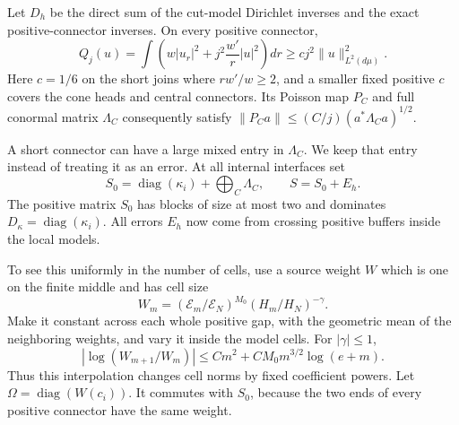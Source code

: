 Let $D_h$ be the direct sum of the cut-model Dirichlet inverses and
the exact positive-connector inverses.  On every positive connector,
\begin{equation}\label{eq:rad-eq-hn5}
 Q_j(u)=\int\left(w|u_r|^2+j^2\frac{w'}r|u|^2\right)dr
               \ge cj^2\|u\|_{L^2(d\mu)}^2.
\end{equation}
Here $c=1/6$ on the short joins where $rw'/w\ge2$, and a smaller
fixed positive $c$ covers the cone heads and central connectors.
Its Poisson map $P_C$ and full conormal matrix $\Lambda_C$ consequently
satisfy $\|P_Ca\|\le(C/j)(a^*\Lambda_Ca)^{1/2}$.

A short connector can have a large mixed entry in $\Lambda_C$.
We keep that entry instead of treating it as an error.  At all internal
interfaces set
\begin{equation}\label{eq:rad-eq-hn6}
 S_0=\operatorname{diag}(\kappa_i)+\bigoplus_C\Lambda_C,
 \qquad S=S_0+E_h.
\end{equation}
The positive matrix $S_0$ has blocks of size at most two and dominates
$D_\kappa=\operatorname{diag}(\kappa_i)$.  All errors $E_h$ now
come from crossing positive buffers inside the local models.

To see this uniformly in the number of cells, use a source weight $W$
which is one on the finite middle and has cell size
\begin{equation}\label{eq:rad-eq-hn4}
 W_m=(\mathcal E_m/\mathcal E_N)^{M_0}(H_m/H_N)^{-\gamma}.
\end{equation}
Make it constant across each whole positive gap, with the geometric
mean of the neighboring weights, and vary it inside the model cells.
For $|\gamma|\le1$,
\begin{equation}\label{eq:adjacent-weight-ratio-new}
 |\log(W_{m+1}/W_m)|
 \le Cm^2+CM_0m^{3/2}\log(e+m).
\end{equation}
Thus this interpolation changes cell norms by fixed coefficient powers.
Let $\Omega=\operatorname{diag}(W(c_i))$.  It commutes with $S_0$,
because the two ends of every positive connector have the same weight.

